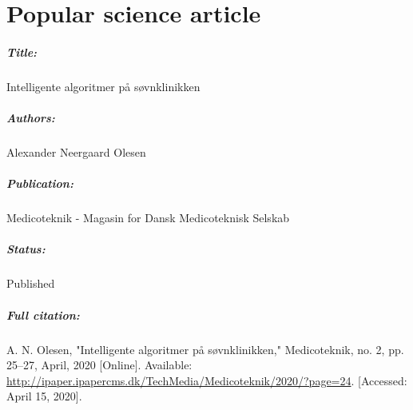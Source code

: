 \chapter{Popular science article}

\paragraph{Title:}
Intelligente algoritmer på søvnklinikken

\paragraph{Authors:}
Alexander Neergaard Olesen

\paragraph{Publication:}
Medicoteknik - Magasin for Dansk Medicoteknisk Selskab

\paragraph{Status:}
Published


\paragraph{Full citation:}
A. N. Olesen, "Intelligente algoritmer på søvnklinikken," Medicoteknik, no. 2, pp. 25--27, April, 2020 [Online]. Available: \url{http://ipaper.ipapercms.dk/TechMedia/Medicoteknik/2020/?page=24}. [Accessed: April 15, 2020].




